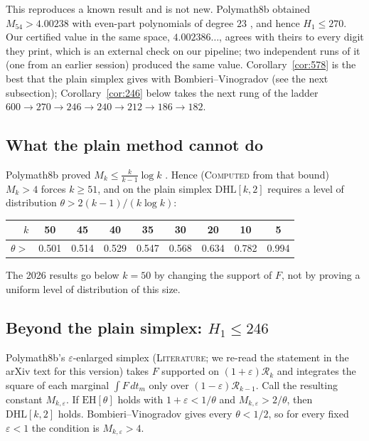 \documentclass[11pt]{amsart}
\theoremstyle{definition}
\theoremstyle{remark}
\newcommand{\lbl}[1]{\textup{\textsc{#1}}}
\newcommand{\DHL}{\mathrm{DHL}}
\newcommand{\R}{\mathcal{R}}
\begin{document}
This reproduces a known result and is not new. Polymath8b obtained
$M_{54}>4.00238$ with even-part polynomials of degree $23$
\cite[Thm.~3.9]{Pol14b}, and hence $H_1\le270$. Our certified value in the
same space, $4.002386\ldots$, agrees with theirs to every digit they print,
which is an external check on our pipeline; two independent runs of it (one
from an earlier session) produced the same value. Corollary~\ref{cor:578}
is the best that the plain simplex gives with Bombieri--Vinogradov (see the
next subsection); Corollary~\ref{cor:246} below takes the next rung of the
ladder $600\to270\to246\to240\to212\to186\to182$.

\subsection{What the plain method cannot do}
Polymath8b proved $M_k\le\frac{k}{k-1}\log k$ \cite{Pol14b}. Hence
(\lbl{Computed} from that bound) $M_k>4$ forces $k\ge51$, and on the plain
simplex $\DHL[k,2]$ requires a level of distribution
$\theta>2(k-1)/(k\log k)$:
\begin{center}
\begin{tabular}{@{}rcccccccc@{}}
\toprule
$k$ & 50 & 45 & 40 & 35 & 30 & 20 & 10 & 5\\
\midrule
$\theta>$ & 0.501 & 0.514 & 0.529 & 0.547 & 0.568 & 0.634 & 0.782 & 0.994\\
\bottomrule
\end{tabular}
\end{center}
The 2026 results go below $k=50$ by changing the support of $F$, not by
proving a uniform level of distribution of this size.

\subsection{Beyond the plain simplex: \texorpdfstring{$H_1\le246$}{H1 <= 246}}
Polymath8b's $\varepsilon$-enlarged simplex \cite[Thm.~3.12]{Pol14b}
(\lbl{Literature}; we re-read the statement in the arXiv text for this
version) takes $F$ supported on $(1+\varepsilon)\R_k$ and integrates the
square of each marginal $\int F\,dt_m$ only over $(1-\varepsilon)\R_{k-1}$.
Call the resulting constant $M_{k,\varepsilon}$. If $\mathrm{EH}[\theta]$
holds with $1+\varepsilon<1/\theta$ and $M_{k,\varepsilon}>2/\theta$, then
$\DHL[k,2]$ holds. Bombieri--Vinogradov gives every $\theta<1/2$, so for
every fixed $\varepsilon<1$ the condition is $M_{k,\varepsilon}>4$.
\end{document}
